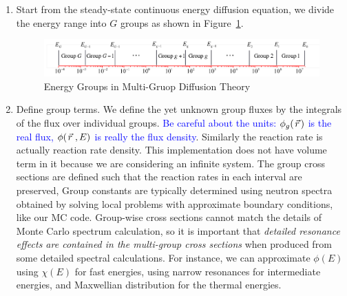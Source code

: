 \documentclass{school-22.211-notes}
\date{April 2, 2012}
\begin{document}
\maketitle

 \label{multi-group-diffusion}
\begin{enumerate}
\item Start from the steady-state continuous energy diffusion equation, we divide the energy range into $G$ groups as shown in Figure~\ref{energy-groups}. 
\begin{figure}[ht]
  \centering
  \includegraphics[width=6in]{images/dfs/energy-group.png}
  \caption{Energy Groups in Multi-Gruop Diffusion Theory} \label{energy-groups}
\end{figure}

\item Define group terms. We define the yet unknown group fluxes by the integrals of the flux over individual groups. \textcolor{blue}{Be careful about the units: $\phi_g(\left.\vec{r}\right.)$ is the real flux, $\phi(\left.\vec{r}\right., E)$ is really the flux density}. Similarly the reaction rate is actually reaction rate density. This implementation does not have volume term in it because we are considering an infinite system. 
The group cross sections are defined such that the reaction rates in each interval are preserved,
Group constants are typically determined using neutron spectra obtained by solving local problems with approximate boundary conditions, like our MC code. Group-wise cross sections cannot match the details of Monte Carlo spectrum calculation, so it is important that \textit{detailed resonance effects are contained in the multi-group cross sections} when produced from some detailed spectral calculations. For instance, we can approximate $\phi(E)$ using $\chi(E)$ for fast energies, using narrow resonances for intermediate energies, and Maxwellian distribution for the thermal energies. 




\end{enumerate}
\end{document}
